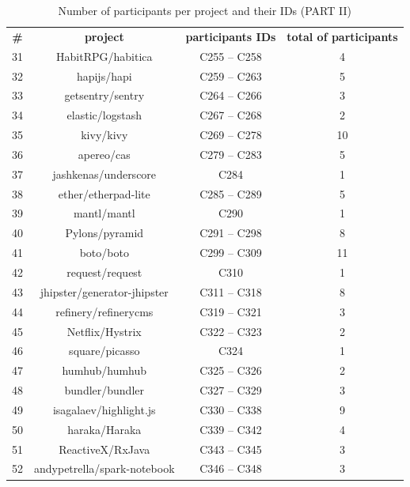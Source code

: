 \begin{appendices}
	\begin{table}[H]
	\centering
	\caption{Number of participants per project and their IDs (PART II)}
	\begin{tabular}{|c|c|c|c|}
		\hline
		\textbf{\#} & \multicolumn{1}{c|}{\textbf{project}} & \textbf{participants IDs } & \textbf{total of participants} \bigstrut\\				
		31    & HabitRPG/habitica & C255 -- C258 & 4 \bigstrut\\
		\hline
		32    & hapijs/hapi & C259 -- C263 & 5 \bigstrut\\
		\hline
		33    & getsentry/sentry & C264 -- C266 & 3 \bigstrut\\
		\hline
		34    & elastic/logstash & C267 -- C268 & 2 \bigstrut\\
		\hline
		35    & kivy/kivy & C269 -- C278 & 10 \bigstrut\\
		\hline
		36    & apereo/cas & C279 -- C283 & 5 \bigstrut\\
		\hline
		37    & jashkenas/underscore & C284  & 1 \bigstrut\\
		\hline
		38    & ether/etherpad-lite & C285 -- C289 & 5 \bigstrut\\
		\hline
		39    & mantl/mantl & C290  & 1 \bigstrut\\
		\hline
		40    & Pylons/pyramid & C291 -- C298 & 8 \bigstrut\\
		\hline			
		41    & boto/boto & C299 -- C309 & 11 \bigstrut\\
		\hline
		42    & request/request & C310  & 1 \bigstrut\\
		\hline
		43    & jhipster/generator-jhipster & C311 -- C318 & 8 \bigstrut\\
		\hline
		44    & refinery/refinerycms & C319 -- C321 & 3 \bigstrut\\
		\hline
		45    & Netflix/Hystrix & C322 -- C323 & 2 \bigstrut\\
		\hline
		46    & square/picasso & C324  & 1 \bigstrut\\
		\hline
		47    & humhub/humhub & C325 -- C326 & 2 \bigstrut\\
		\hline
		48    & bundler/bundler & C327 -- C329 & 3 \bigstrut\\
		\hline
		49    & isagalaev/highlight.js & C330 -- C338 & 9 \bigstrut\\
		\hline
		50    & haraka/Haraka & C339 -- C342 & 4 \bigstrut\\
		\hline
		51    & ReactiveX/RxJava & C343 -- C345 & 3 \bigstrut\\
		\hline
		52    & andypetrella/spark-notebook & C346 -- C348 & 3 \bigstrut\\

\end{tabular}
\end{table}
\end{appendices}
